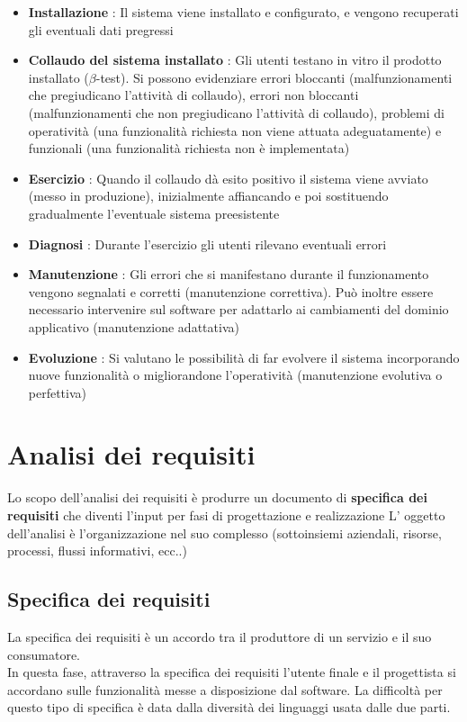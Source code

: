 \documentclass{report}
\begin{document}
\begin{itemize}
        \item \textbf{Installazione} : Il sistema viene installato e configurato, e vengono recuperati gli eventuali dati pregressi
        \item \textbf{Collaudo del sistema installato} : Gli utenti testano in vitro il prodotto installato ($\beta$-test). Si possono evidenziare errori bloccanti (malfunzionamenti che pregiudicano l'attività di collaudo), errori non bloccanti (malfunzionamenti che non pregiudicano l'attività di collaudo), problemi di operatività (una funzionalità richiesta non viene attuata adeguatamente) e funzionali (una funzionalità richiesta non è implementata)
        \item \textbf{Esercizio} : Quando il collaudo dà esito positivo il sistema viene avviato (messo in produzione), inizialmente affiancando e poi sostituendo gradualmente l'eventuale sistema preesistente
        \item \textbf{Diagnosi} : Durante l'esercizio gli utenti rilevano eventuali errori
        \item \textbf{Manutenzione} : Gli errori che si manifestano durante il funzionamento vengono segnalati e corretti (manutenzione correttiva). Può inoltre essere necessario intervenire sul software per adattarlo ai cambiamenti del dominio applicativo (manutenzione adattativa) 
        \item \textbf{Evoluzione} : Si valutano le possibilità di far evolvere il sistema incorporando nuove funzionalità o migliorandone l'operatività (manutenzione evolutiva o perfettiva)
    \end{itemize}
        \section{Analisi dei requisiti}\label{Analisi}
            Lo scopo dell'analisi dei requisiti è produrre un documento di \textbf{specifica dei requisiti} che diventi l'input per fasi di progettazione e realizzazione
            L' oggetto dell'analisi è l'organizzazione nel suo complesso (sottoinsiemi aziendali, risorse, processi, flussi informativi, ecc..)
            \subsection{Specifica dei requisiti}
                La specifica dei requisiti è un accordo tra il produttore di un servizio e  il suo consumatore.
                \\
                In questa fase, attraverso la specifica dei requisiti l'utente finale e il progettista si accordano sulle funzionalità messe a disposizione dal software. La difficoltà per questo tipo di specifica è data dalla diversità dei linguaggi usata dalle due parti.
\end{document}
